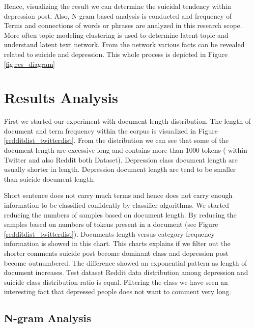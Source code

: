 \documentclass[sn-mathphys,Numbered]{sn-jnl}%
\theoremstyle{thmstyleone}%
\theoremstyle{thmstyletwo}%
\theoremstyle{thmstylethree}%
\begin{document}
Hence, visualizing the result we can determine the suicidal tendency within depression post. Also, N-gram based analysis is conducted and frequency of Terms and connections of words or phrases are analyzed in this research scope. More often topic modeling clustering is used to determine latent topic and understand latent text network. From the network various facts can be revealed related to suicide and depression. This whole process is depicted in Figure \ref{fig:res_diagram}


\section{Results Analysis}\label{sec2}
First we started our experiment with document length distribution. The length of document and term frequency within the corpus is visualized in Figure \ref{redditdist_twitterdist}. From the distribution we can see that some of the document length are excessive long and contains more than 1000 tokens ( within Twitter and also Reddit both Dataset). Depression class document length are usually shorter in length. Depression document length are tend to be smaller than suicide document length. 

Short sentence does not carry much terms and hence does not carry enough information to be classified confidently by classifier algorithms. We started reducing the numbers of samples based on document length. By reducing the samples based on numbers of tokens present in a document (see Figure \ref{redditdist_twitterdist}). Documents length versus category frequency information is showed in this chart. This charts explains if we filter out the shorter comments suicide post become dominant class and depression post become outnumbered. The difference showed an exponential pattern as length of document increases. Test dataset Reddit data distribution among depression and suicide class distribution ratio is equal. Filtering the class we have seen an interesting fact that depressed people does not want to comment very long. 



\subsection{N-gram Analysis}
\end{document}
